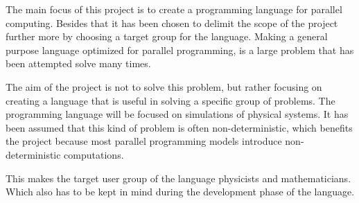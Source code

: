 \label{part:introduction}
The main focus of this project is to create a programming language for parallel computing. Besides that it has been chosen to delimit the scope of the project further more by choosing a target group for the language. Making a general purpose language optimized for parallel programming, is a large problem that has been attempted solve many times\cite{parallel programming languages}. 

The aim of the project is not to solve this problem, but rather focusing on creating a language that is useful in solving a specific group of problems. The programming language will be focused on simulations of physical systems. It has been assumed that this kind of problem is often non-deterministic, which benefits the project because most parallel programming models introduce non-deterministic computations. 

This makes the target user group of the language physicists and mathematicians. Which also has to be kept in mind during the development phase of the language.